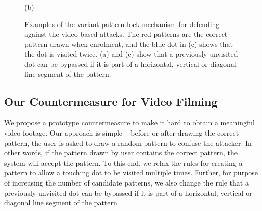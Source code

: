 \begin{figure}[!t]
{\begin{minipage}[t]{0.11\textwidth}
                \centering \footnotesize (b)
             \end{minipage}
        }
        \hspace{0.3cm}
        \caption{Examples of the variant pattern lock mechanism for defending against the video-based attacks. The red patterns are the correct pattern drawn when enrolment, and the blue dot in (c) shows that the dot is visited twice. (a) and (c) show that a previously unvisited dot can be bypassed if it is part of a horizontal, vertical or diagonal line segment of the pattern.}
        \label{fig:protection}
    \end{figure}

\subsection{Our Countermeasure for Video Filming}
We propose a prototype countermeasure to make it hard to obtain a meaningful video footage.
Our approach is simple -- before or after drawing the correct pattern, the user is asked to draw a random pattern to confuse the attacker. In other words, if the pattern drawn by user contains the correct pattern, the system will accept the pattern. To this end, we relax the rules for creating a pattern to allow a touching dot to be visited multiple times. Further, for purpose of increasing the number of candidate patterns, we also change the rule that a previously unvisited dot can be bypassed if it is part of a horizontal, vertical or diagonal line segment of the pattern.



